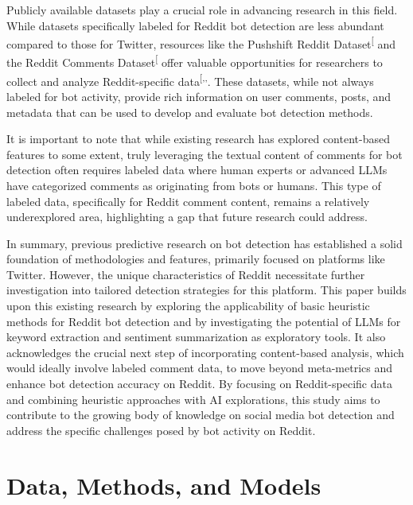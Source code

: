 \documentclass[
  12pt,
  letterpaper,
  DIV=11,
  numbers=noendperiod]{scrartcl}
\begin{document}
Publicly available datasets play a crucial role in advancing research in
this field. While datasets specifically labeled for Reddit bot detection
are less abundant compared to those for Twitter, resources like the
Pushshift Reddit
Dataset\textsuperscript{{[}\citeproc{ref-pushshiftredditdataset}{10}{]}}
and the Reddit Comments
Dataset\textsuperscript{{[}\citeproc{ref-redditcommentsdataset}{11}{]}}
offer valuable opportunities for researchers to collect and analyze
Reddit-specific
data\textsuperscript{{[},,\citeproc{ref-redditcommentsdataset}{11}{]}}.
These datasets, while not always labeled for bot activity, provide rich
information on user comments, posts, and metadata that can be used to
develop and evaluate bot detection methods.

It is important to note that while existing research has explored
content-based features to some extent, truly leveraging the textual
content of comments for bot detection often requires labeled data where
human experts or advanced LLMs have categorized comments as originating
from bots or humans. This type of labeled data, specifically for Reddit
comment content, remains a relatively underexplored area, highlighting a
gap that future research could address.

In summary, previous predictive research on bot detection has
established a solid foundation of methodologies and features, primarily
focused on platforms like Twitter. However, the unique characteristics
of Reddit necessitate further investigation into tailored detection
strategies for this platform. This paper builds upon this existing
research by exploring the applicability of basic heuristic methods for
Reddit bot detection and by investigating the potential of LLMs for
keyword extraction and sentiment summarization as exploratory tools. It
also acknowledges the crucial next step of incorporating content-based
analysis, which would ideally involve labeled comment data, to move
beyond meta-metrics and enhance bot detection accuracy on Reddit. By
focusing on Reddit-specific data and combining heuristic approaches with
AI explorations, this study aims to contribute to the growing body of
knowledge on social media bot detection and address the specific
challenges posed by bot activity on Reddit.

\section{Data, Methods, and Models}\label{data-methods-and-models}
\end{document}
